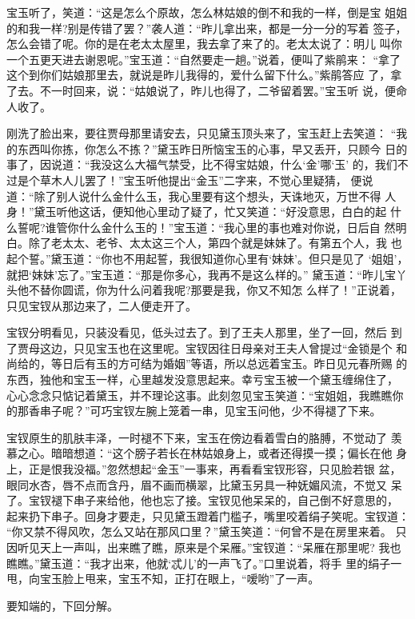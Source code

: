 宝玉听了，笑道：“这是怎么个原故，怎么林姑娘的倒不和我的一样，倒是宝
姐姐的和我一样?别是传错了罢？”袭人道：“昨儿拿出来，都是一分一分的写着
签子，怎么会错了呢。你的是在老太太屋里，我去拿了来了的。老太太说了：明儿
叫你一个五更天进去谢恩呢。”宝玉道：“自然要走一趟。”说着，便叫了紫鹃来：
“拿了这个到你们姑娘那里去，就说是昨儿我得的，爱什么留下什么。”紫鹃答应
了，拿了去。不一时回来，说：“姑娘说了，昨儿也得了，二爷留着罢。”宝玉听
说，便命人收了。

刚洗了脸出来，要往贾母那里请安去，只见黛玉顶头来了，宝玉赶上去笑道：
“我的东西叫你拣，你怎么不拣？”黛玉昨日所恼宝玉的心事，早又丢开，只顾今
日的事了，因说道：“我没这么大福气禁受，比不得宝姑娘，什么‘金’哪‘玉’
的，我们不过是个草木人儿罢了！”宝玉听他提出“金玉”二字来，不觉心里疑猜，
便说道：“除了别人说什么金什么玉，我心里要有这个想头，天诛地灭，万世不得
人身！”黛玉听他这话，便知他心里动了疑了，忙又笑道：“好没意思，白白的起
什么誓呢?谁管你什么金什么玉的！”宝玉道：“我心里的事也难对你说，日后自
然明白。除了老太太、老爷、太太这三个人，第四个就是妹妹了。有第五个人，我
也起个誓。”黛玉道：“你也不用起誓，我很知道你心里有‘妹妹’。但只是见了
‘姐姐’，就把‘妹妹’忘了。”宝玉道：“那是你多心，我再不是这么样的。”
黛玉道：“昨儿宝丫头他不替你圆谎，你为什么问着我呢?那要是我，你又不知怎
么样了！”正说着，只见宝钗从那边来了，二人便走开了。

宝钗分明看见，只装没看见，低头过去了。到了王夫人那里，坐了一回，然后
到了贾母这边，只见宝玉也在这里呢。宝钗因往日母亲对王夫人曾提过“金锁是个
和尚给的，等日后有玉的方可结为婚姻”等语，所以总远着宝玉。昨日见元春所赐
的东西，独他和宝玉一样，心里越发没意思起来。幸亏宝玉被一个黛玉缠绵住了，
心心念念只惦记着黛玉，并不理论这事。此刻忽见宝玉笑道：“宝姐姐，我瞧瞧你
的那香串子呢？”可巧宝钗左腕上笼着一串，见宝玉问他，少不得褪了下来。

宝钗原生的肌肤丰泽，一时褪不下来，宝玉在傍边看着雪白的胳膊，不觉动了
羡慕之心。暗暗想道：“这个膀子若长在林姑娘身上，或者还得摸一摸；偏长在他
身上，正是恨我没福。”忽然想起“金玉”一事来，再看看宝钗形容，只见脸若银
盆，眼同水杏，唇不点而含丹，眉不画而横翠，比黛玉另具一种妩媚风流，不觉又
呆了。宝钗褪下串子来给他，他也忘了接。宝钗见他呆呆的，自己倒不好意思的，
起来扔下串子。回身才要走，只见黛玉蹬着门槛子，嘴里咬着绢子笑呢。宝钗道：
“你又禁不得风吹，怎么又站在那风口里？”黛玉笑道：“何曾不是在房里来着。
只因听见天上一声叫，出来瞧了瞧，原来是个呆雁。”宝钗道：“呆雁在那里呢?
我也瞧瞧。”黛玉道：“我才出来，他就‘忒儿’的一声飞了。”口里说着，将手
里的绢子一甩，向宝玉脸上甩来，宝玉不知，正打在眼上，“嗳哟”了一声。

要知端的，下回分解。